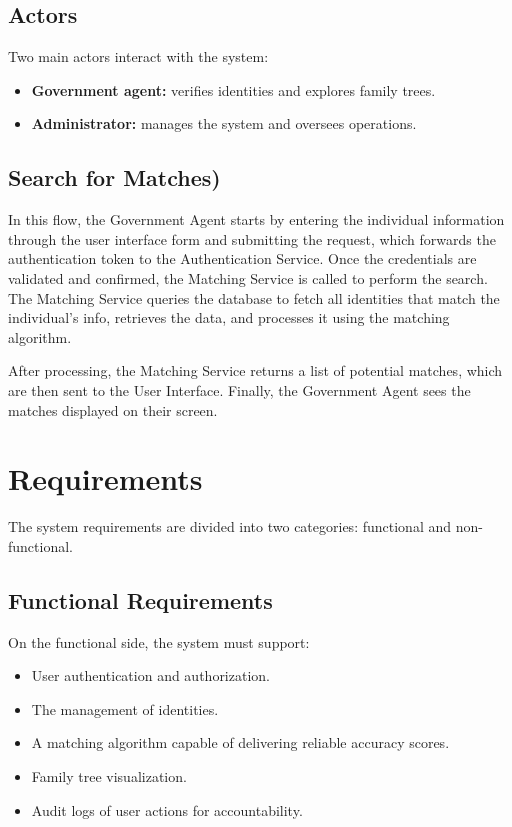 \subsection{Actors}
Two main actors interact with the system:
\begin{itemize}
    \item \textbf{Government agent:} verifies identities and explores family trees.
    \item \textbf{Administrator:} manages the system and oversees operations.
\end{itemize}

\subsection{ Search for Matches)}
In this flow, the Government Agent starts by entering the individual information through the user interface form and submitting the request, which forwards the authentication token to the Authentication Service. Once the credentials are validated and confirmed, the Matching Service is called to perform the search. The Matching Service queries the database to fetch all identities that match the individual's info, retrieves the data, and processes it using the matching algorithm.

After processing, the Matching Service returns a list of potential matches, which are then sent to the User Interface. Finally, the Government Agent sees the matches displayed on their screen.

\section{Requirements}
The system requirements are divided into two categories: functional and non-functional.

\subsection{Functional Requirements}
On the functional side, the system must support:
\begin{itemize}
    \item User authentication and authorization.
    \item The management of identities.
    \item A matching algorithm capable of delivering reliable accuracy scores.
    \item Family tree visualization.
    \item Audit logs of user actions for accountability.
\end{itemize}

